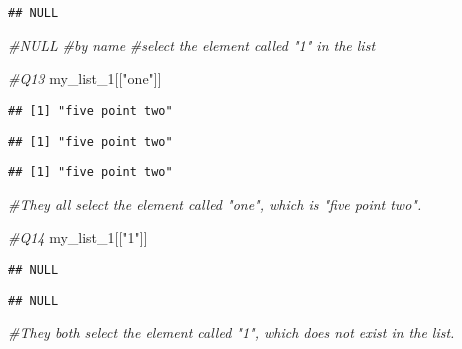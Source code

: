 \documentclass[
]{article}
\newenvironment{Shaded}{\begin{snugshade}}{\end{snugshade}}
\newcommand{\CommentTok}[1]{\textcolor[rgb]{0.56,0.35,0.01}{\textit{#1}}}
\newcommand{\NormalTok}[1]{#1}
\newcommand{\SpecialCharTok}[1]{\textcolor[rgb]{0.00,0.00,0.00}{#1}}
\newcommand{\StringTok}[1]{\textcolor[rgb]{0.31,0.60,0.02}{#1}}
\begin{document}
\begin{verbatim}
## NULL
\end{verbatim}

\begin{Shaded}
\begin{Highlighting}[]
\CommentTok{\#NULL}
\CommentTok{\#by name}
\CommentTok{\#select the element called "1" in the list}

\CommentTok{\#Q13}
\NormalTok{my\_list\_1[[}\StringTok{"one"}\NormalTok{]] }
\end{Highlighting}
\end{Shaded}

\begin{verbatim}
## [1] "five point two"
\end{verbatim}

\begin{Shaded}
\end{Shaded}

\begin{verbatim}
## [1] "five point two"
\end{verbatim}

\begin{Shaded}
\end{Shaded}

\begin{verbatim}
## [1] "five point two"
\end{verbatim}

\begin{Shaded}
\begin{Highlighting}[]
\CommentTok{\#They all select the element called "one", which is "five point two".}

\CommentTok{\#Q14}
\NormalTok{my\_list\_1[[}\StringTok{"1"}\NormalTok{]] }
\end{Highlighting}
\end{Shaded}

\begin{verbatim}
## NULL
\end{verbatim}

\begin{Shaded}
\end{Shaded}

\begin{verbatim}
## NULL
\end{verbatim}

\begin{Shaded}
\begin{Highlighting}[]
\CommentTok{\#They both select the element called "1", which does not exist in the list.}
\end{Highlighting}
\end{Shaded}
\end{document}
